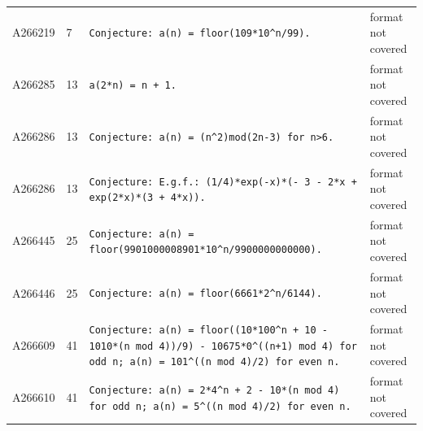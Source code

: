\documentclass[11pt]{article}
\theoremstyle{definition}
\theoremstyle{remark}
\begin{document}
{\begin{longtable}{p{1.3cm}p{0.7cm}p{10cm}p{3cm}}
A266219 & 7 & \texttt{Conjecture: \allowbreak{}a(n)\allowbreak{} \allowbreak{}=\allowbreak{} \allowbreak{}floor(109*\allowbreak{}10\^{}n/\allowbreak{}99)\allowbreak{}.} & format not covered \\
A266285 & 13 & \texttt{a(2*\allowbreak{}n)\allowbreak{} \allowbreak{}=\allowbreak{} \allowbreak{}n \allowbreak{}+\allowbreak{} \allowbreak{}1.} & format not covered \\
A266286 & 13 & \texttt{Conjecture: \allowbreak{}a(n)\allowbreak{} \allowbreak{}=\allowbreak{} \allowbreak{}(n\^{}2)\allowbreak{}mod(2n-\allowbreak{}3)\allowbreak{} \allowbreak{}for \allowbreak{}n>6.} & format not covered \\
A266286 & 13 & \texttt{Conjecture: \allowbreak{}E.g.f.: \allowbreak{}(1/\allowbreak{}4)\allowbreak{}*\allowbreak{}exp(-\allowbreak{}x)\allowbreak{}*\allowbreak{}(-\allowbreak{} \allowbreak{}3 \allowbreak{}-\allowbreak{} \allowbreak{}2*\allowbreak{}x \allowbreak{}+\allowbreak{} \allowbreak{}exp(2*\allowbreak{}x)\allowbreak{}*\allowbreak{}(3 \allowbreak{}+\allowbreak{} \allowbreak{}4*\allowbreak{}x)\allowbreak{})\allowbreak{}.} & format not covered \\
A266445 & 25 & \texttt{Conjecture: \allowbreak{}a(n)\allowbreak{} \allowbreak{}=\allowbreak{} \allowbreak{}floor(9901000008901*\allowbreak{}10\^{}n/\allowbreak{}9900000000000)\allowbreak{}.} & format not covered \\
A266446 & 25 & \texttt{Conjecture: \allowbreak{}a(n)\allowbreak{} \allowbreak{}=\allowbreak{} \allowbreak{}floor(6661*\allowbreak{}2\^{}n/\allowbreak{}6144)\allowbreak{}.} & format not covered \\
A266609 & 41 & \texttt{Conjecture: \allowbreak{}a(n)\allowbreak{} \allowbreak{}=\allowbreak{} \allowbreak{}floor((10*\allowbreak{}100\^{}n \allowbreak{}+\allowbreak{} \allowbreak{}10 \allowbreak{}-\allowbreak{} \allowbreak{}1010*\allowbreak{}(n \allowbreak{}mod \allowbreak{}4)\allowbreak{})\allowbreak{}/\allowbreak{}9)\allowbreak{} \allowbreak{}-\allowbreak{} \allowbreak{}10675*\allowbreak{}0\^{}((n+\allowbreak{}1)\allowbreak{} \allowbreak{}mod \allowbreak{}4)\allowbreak{} \allowbreak{}for \allowbreak{}odd \allowbreak{}n; \allowbreak{}a(n)\allowbreak{} \allowbreak{}=\allowbreak{} \allowbreak{}101\^{}((n \allowbreak{}mod \allowbreak{}4)\allowbreak{}/\allowbreak{}2)\allowbreak{} \allowbreak{}for \allowbreak{}even \allowbreak{}n.} & format not covered \\
A266610 & 41 & \texttt{Conjecture: \allowbreak{}a(n)\allowbreak{} \allowbreak{}=\allowbreak{} \allowbreak{}2*\allowbreak{}4\^{}n \allowbreak{}+\allowbreak{} \allowbreak{}2 \allowbreak{}-\allowbreak{} \allowbreak{}10*\allowbreak{}(n \allowbreak{}mod \allowbreak{}4)\allowbreak{} \allowbreak{}for \allowbreak{}odd \allowbreak{}n; \allowbreak{}a(n)\allowbreak{} \allowbreak{}=\allowbreak{} \allowbreak{}5\^{}((n \allowbreak{}mod \allowbreak{}4)\allowbreak{}/\allowbreak{}2)\allowbreak{} \allowbreak{}for \allowbreak{}even \allowbreak{}n.} & format not covered \\

\end{longtable}}
\end{document}
